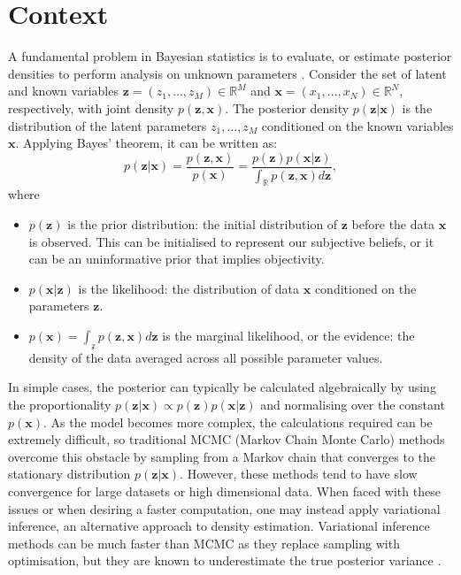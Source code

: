 \documentclass[honours,12pt]{unswthesis}
\newcommand{\R}{\mathbb{R}}
\numberwithin{equation}{section}
\theoremstyle{definition}
\begin{document}
\section{Context}
A fundamental problem in Bayesian statistics is to evaluate, or estimate posterior densities to perform analysis on unknown parameters \citep{gelman}. Consider the set of latent and known variables $\bm{z}=(z_1,\dots,z_M)\in \R^M$ and $\bm{x}=(x_1,\dots,x_N)\in \R^N$, respectively, with joint density $p(\bm{z},\bm{x})$. The posterior density $p(\bm{z}|\bm{x})$ is the distribution of the latent parameters $z_1,\dots,z_M$ conditioned on the known variables $\bm{x}$. Applying Bayes' theorem, it can be written as:
\begin{equation*}
p(\bm{z}|\bm{x})=\frac{p(\bm{z},\bm{x})}{p(\bm{x})}= \frac{p(\bm{z})p(\bm{x}|\bm{z})}{\int_\R p(\bm{z},\bm{x})d\bm{z}},
\end{equation*}
where
\begin{itemize}
\item $p(\bm{z})$ is the prior distribution: the initial distribution of $\bm{z}$ before the data $\bm{x}$ is observed. This can be initialised to represent our subjective beliefs, or it can be an uninformative prior that implies objectivity.
\item $p(\bm{x}|\bm{z})$ is the likelihood: the distribution of data $\bm{x}$ conditioned on the parameters $\bm{z}$.
\item $p(\bm{x})=\int_\mathcal{z}p(\bm{z},\bm{x})d\bm{z}$ is the marginal likelihood, or the evidence: the density of the data averaged across all possible parameter values.
\end{itemize}
In simple cases, the posterior can typically be calculated algebraically by using the proportionality $p(\bm{z}|\bm{x})\propto p(\bm{z})p(\bm{x|z})$ and normalising over the constant $p(\bm{x})$. As the model becomes more complex, the calculations required can be extremely difficult, so
traditional MCMC (Markov Chain Monte Carlo) methods overcome this obstacle by sampling from a Markov chain that converges to the stationary distribution $p(\bm{z}|\bm{x})$. However, these methods tend to have slow convergence for large datasets or high dimensional data. When faced with these issues or when desiring a faster computation, one may instead apply variational inference, an alternative approach to density estimation. Variational inference methods can be much faster than MCMC as they replace sampling with optimisation, but they are known to underestimate the true posterior variance \citep{blei}.
\end{document}
